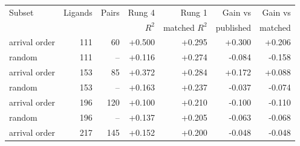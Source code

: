 \begin{tabular}{lrrrrrr}
\toprule
Subset & Ligands & Pairs & Rung 4 & Rung 1 & Gain vs & Gain vs \\
 & & & $R^2$ & matched $R^2$ & published & matched \\
\midrule
arrival order & 111 & 60 & +0.500 & +0.295 & +0.300 & +0.206 \\
random & 111 & -- & +0.116 & +0.274 & -0.084 & -0.158 \\
arrival order & 153 & 85 & +0.372 & +0.284 & +0.172 & +0.088 \\
random & 153 & -- & +0.163 & +0.237 & -0.037 & -0.074 \\
arrival order & 196 & 120 & +0.100 & +0.210 & -0.100 & -0.110 \\
random & 196 & -- & +0.137 & +0.205 & -0.063 & -0.068 \\
arrival order & 217 & 145 & +0.152 & +0.200 & -0.048 & -0.048 \\
\bottomrule
\end{tabular}
